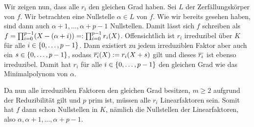 \begin{exercisePage}
\begin{enumerate}[leftmargin=*, label=(zu \alph*)]
		Wir zeigen nun, dass alle $r_i$ den gleichen Grad haben. 		
		Sei $L$ der Zerfällungskörper von $f$. Wir betrachten eine Nullstelle $\alpha \in L$ von $f$. Wie wir bereits gesehen haben, sind dann auch $\alpha + 1 , \dots , \alpha + p - 1$ Nullstellen. Damit lässt sich $f$ schreiben als $f = \prod_{i=0}^{p-1} (X - (\alpha + i)) \mathrel{=:} \prod_{i=0}^{p-1} r_i(X)$. Offensichtlich ist $r_i$ irreduzibel über $K$ für alle $i \in \left\{ 0, \dots , p-1 \right\}$. Dann existiert zu jedem irreduziblen Faktor aber auch ein $s \in \left\{ 0, \dots , p-1 \right\}$, sodass $\overline{r_i}(X) \mathrel{:=} r_i(X+s)$ gilt und dieses $\overline{r_i}$ ist ebenso irreduzibel. Damit hat $r_i$ für alle $i \in \left\{ 0 , \dots , p-1 \right\}$ den gleichen Grad wie das Minimalpolynom von $\alpha$.
		
		Da nun alle irreduziblen Faktoren den gleichen Grad besitzen, $m \geq 2$ aufgrund der Reduzibilität gilt und $p$ prim ist, müssen alle $r_i$ Linearfaktoren sein. Somit hat $f$ dann schon Nullstellen in $K$, nämlich die Nullstellen der Linearfaktoren, also $\alpha , \alpha + 1, \dots , \alpha + p -1$.
	\end{enumerate}
\end{exercisePage}